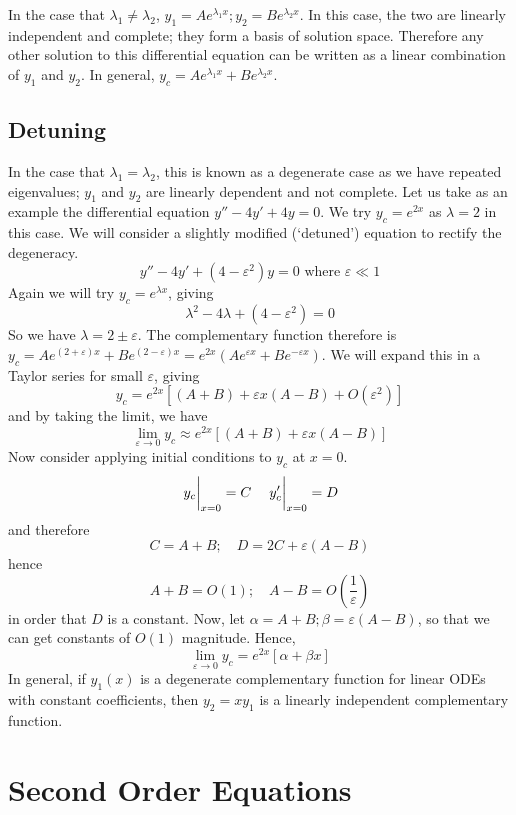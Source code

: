 \documentclass{article}
\begin{document}
	In the case that $\lambda_1 \neq \lambda_2$, $y_1 = Ae^{\lambda_1 x}; y_2 = Be^{\lambda_2 x}$. In this case, the two are linearly independent and complete; they form a basis of solution space. Therefore any other solution to this differential equation can be written as a linear combination of $y_1$ and $y_2$. In general, $y_c = Ae^{\lambda_1 x} + Be^{\lambda_2 x}$.
	
	\subsection{Detuning}
	In the case that $\lambda_1 = \lambda_2$, this is known as a degenerate case as we have repeated eigenvalues; $y_1$ and $y_2$ are linearly dependent and not complete. Let us take as an example the differential equation $y'' - 4y' + 4y = 0$. We try $y_c = e^{2x}$ as $\lambda = 2$ in this case. We will consider a slightly modified (`detuned') equation to rectify the degeneracy.
	\[ y'' - 4y' + (4-\varepsilon^2)y = 0 \text{ where } \varepsilon \ll 1 \]
	Again we will try $y_c = e^{\lambda x}$, giving
	\[ \lambda^2 - 4 \lambda + (4 - \varepsilon^2) = 0 \]
	So we have $\lambda = 2 \pm \varepsilon$. The complementary function therefore is $y_c = Ae^{(2+\varepsilon)x} + Be^{(2-\varepsilon)x} = e^{2x}\left( Ae^{\varepsilon x} + Be^{-\varepsilon x} \right)$. We will expand this in a Taylor series for small $\varepsilon$, giving
	\[ y_c = e^{2x}\left[ (A + B) + \varepsilon x(A - B) + O(\varepsilon^2) \right] \]
	and by taking the limit, we have
	\[ \lim_{\varepsilon \to 0} y_c \approx e^{2x} \left[ (A + B) + \varepsilon x(A - B) \right] \]
	Now consider applying initial conditions to $y_c$ at $x = 0$.
	\[ \eval{y_c}_{x=0} = C\quad \eval{y_c'}_{x=0} = D \]
	and therefore
	\[ C = A + B;\quad D = 2C + \varepsilon(A - B) \]
	hence
	\[ A + B = O(1);\quad A - B = O\left(\frac{1}{\varepsilon}\right) \]
	in order that $D$ is a constant. Now, let $\alpha = A + B; \beta = \varepsilon(A - B)$, so that we can get constants of $O(1)$ magnitude. Hence,
	\[ \lim_{\varepsilon \to 0} y_c = e^{2x}\left[ \alpha + \beta x \right] \]
	In general, if $y_1(x)$ is a degenerate complementary function for linear ODEs with constant coefficients, then $y_2 = xy_1$ is a linearly independent complementary function.

	\section{Second Order Equations}
\end{document}
